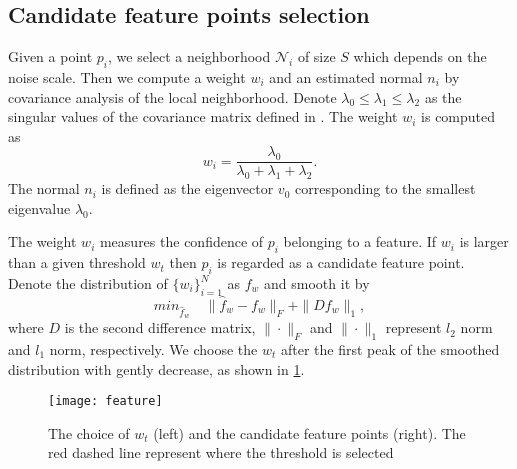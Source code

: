 \subsection{Candidate feature points selection}
\label{subsec:candidateFeature}
Given a point $p_{i}$, we select a neighborhood $\mathcal {N}_{i}$ of size
$S$ which depends on the noise scale. Then we compute a weight
$w_{i}$ and an
estimated normal $n_{i}$ by covariance analysis of the local
neighborhood. Denote $\lambda_0 \leq \lambda_1 \leq \lambda_2$ as the singular values of the covariance matrix defined in \cite{PaulyKKG03}.
The weight $w_{i}$ is computed as
$$w_{i}=\frac{\lambda_{0}}{\lambda_{0}+\lambda_{1}+\lambda_{2}}.$$
The normal $n_{i}$ is defined as the eigenvector $v_{0}$ corresponding to the smallest eigenvalue $\lambda_{0}$.

The weight $w_{i}$ measures the confidence of $p_{i}$ belonging to a feature.
If $w_{i}$ is larger than a given threshold $w_{t}$ then $p_{i}$ is regarded as a candidate feature point.
%
Denote the distribution of $\{ w_{i} \}_{i=1}^{N}$ as $f_{w}$ and smooth it by
$$min_{\hat{f}_{w}} \quad \|\hat{f}_{w}-f_{w}\|_{F}+\|Df_{w}\|_{1},$$where $D$ is the second difference matrix, $\|\cdot\|_{F}$ and $\|\cdot\|_{1}$ represent $l_{2}$ norm and $l_{1}$ norm, respectively. We choose the $w_{t}$ after the first peak of the smoothed distribution with gently decrease, as shown in \fig \ref{fig:Candidate_threshold}.
\begin{figure}
  \centering
  \texttt{[image: feature]}
  \caption{The choice of $w_{t}$ (left) and the candidate feature points (right). The red dashed line represent where the threshold is selected }\label{fig:Candidate_threshold}
\end{figure}

